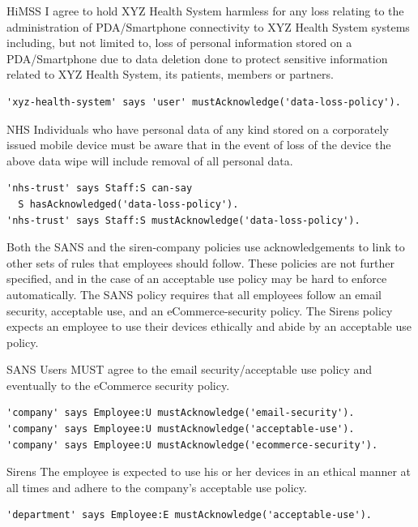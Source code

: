 \documentclass[thesis.tex]{subfiles}
\begin{document}
\begin{center}
  \noindent
    \begin{policyrule}{HiMSS}
      I agree to hold XYZ Health System harmless for any loss relating to the
      administration of PDA/Smartphone connectivity to XYZ Health System systems
      including, but not limited to, loss of personal information stored on a
      PDA/Smartphone due to data deletion done to protect sensitive information
      related to XYZ Health System, its patients, members or partners.
      \normalfont
      \begin{lstlisting}
'xyz-health-system' says 'user' mustAcknowledge('data-loss-policy').
      \end{lstlisting}
    \end{policyrule}
    \begin{policyrule}{NHS}
      Individuals who have personal data of any kind stored on a corporately
      issued mobile device must be aware that in the event of loss of the device
      the above data wipe will include removal of all personal data.
      \normalfont
      \begin{lstlisting}
'nhs-trust' says Staff:S can-say
  S hasAcknowledged('data-loss-policy').
'nhs-trust' says Staff:S mustAcknowledge('data-loss-policy').
      \end{lstlisting}
    \end{policyrule}
\end{center}

Both the SANS and the siren-company policies use acknowledgements to link to other sets of rules that employees should follow.
These policies are not further specified, and in the case of an acceptable use policy may be hard to enforce automatically.
The SANS policy requires that all employees follow an email security, acceptable use, and an eCommerce-security policy.
The Sirens policy expects an employee to use their devices ethically and abide by an acceptable use policy.

\begin{policyrule}{SANS}
  Users MUST agree to the email security/acceptable use policy and eventually to the eCommerce security policy.
  \begin{lstlisting}
'company' says Employee:U mustAcknowledge('email-security').
'company' says Employee:U mustAcknowledge('acceptable-use').
'company' says Employee:U mustAcknowledge('ecommerce-security').
  \end{lstlisting}
\end{policyrule}
\begin{policyrule}{Sirens}
  The employee is expected to use his or her devices in an ethical manner at all times and adhere to the company's acceptable use policy.
  \begin{lstlisting}
'department' says Employee:E mustAcknowledge('acceptable-use').
  \end{lstlisting}
\end{policyrule}
\end{document}
